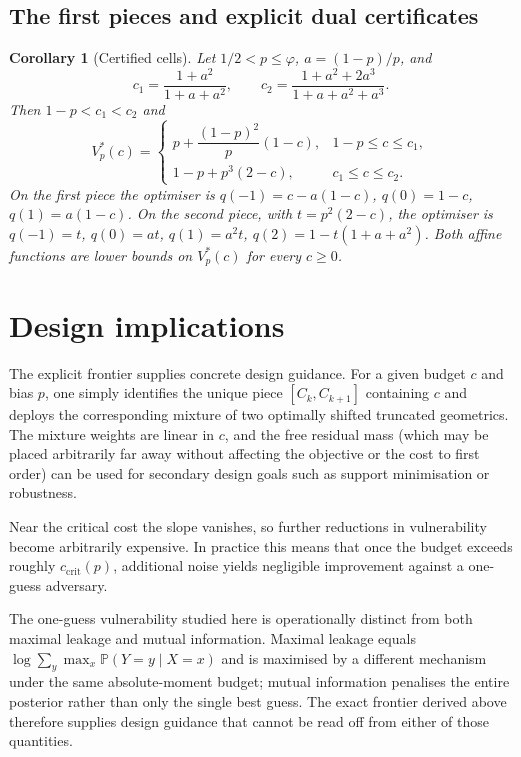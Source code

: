 \documentclass[conference]{IEEEtran}
\newtheorem{corollary}[theorem]{Corollary}
\newcommand{\Prob}{\mathbb{P}}
\begin{document}
\subsection{The first pieces and explicit dual certificates}
\begin{corollary}[Certified cells]\label{cor:cells}
Let \(1/2<p\le\varphi\), \(a=(1-p)/p\), and
\[
c_1=\frac{1+a^2}{1+a+a^2},\qquad c_2=\frac{1+a^2+2a^3}{1+a+a^2+a^3}.
\]
Then \(1-p<c_1<c_2\) and
\[
V_p^*(c)=\begin{cases}
p+\dfrac{(1-p)^2}{p}(1-c), & 1-p\le c\le c_1,\\[2mm]
1-p+p^3(2-c), & c_1\le c\le c_2.
\end{cases}
\]
On the first piece the optimiser is \(q(-1)=c-a(1-c)\), \(q(0)=1-c\), \(q(1)=a(1-c)\). On the second piece, with \(t=p^2(2-c)\), the optimiser is \(q(-1)=t\), \(q(0)=at\), \(q(1)=a^2t\), \(q(2)=1-t(1+a+a^2)\). Both affine functions are lower bounds on \(V_p^*(c)\) for every \(c\ge0\).
\end{corollary}

\section{Design implications}
The explicit frontier supplies concrete design guidance. For a given budget \(c\) and bias \(p\), one simply identifies the unique piece \([C_k,C_{k+1}]\) containing \(c\) and deploys the corresponding mixture of two optimally shifted truncated geometrics. The mixture weights are linear in \(c\), and the free residual mass (which may be placed arbitrarily far away without affecting the objective or the cost to first order) can be used for secondary design goals such as support minimisation or robustness.

Near the critical cost the slope vanishes, so further reductions in vulnerability become arbitrarily expensive. In practice this means that once the budget exceeds roughly \(c_{\mathrm{crit}}(p)\), additional noise yields negligible improvement against a one-guess adversary.

The one-guess vulnerability studied here is operationally distinct from both maximal leakage and mutual information. Maximal leakage equals \(\log\sum_y\max_x\Prob(Y=y\mid X=x)\) and is maximised by a different mechanism under the same absolute-moment budget; mutual information penalises the entire posterior rather than only the single best guess. The exact frontier derived above therefore supplies design guidance that cannot be read off from either of those quantities.
\end{document}
